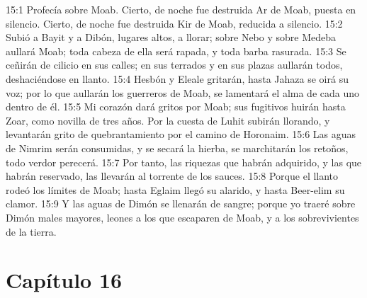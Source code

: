 15:1 Profecía sobre Moab. Cierto, de noche fue destruida Ar de Moab, puesta en silencio. Cierto, de noche fue destruida Kir de Moab, reducida a silencio. 
15:2 Subió a Bayit y a Dibón, lugares altos, a llorar; sobre Nebo y sobre Medeba aullará Moab; toda cabeza de ella será rapada, y toda barba rasurada. 
15:3 Se ceñirán de cilicio en sus calles; en sus terrados y en sus plazas aullarán todos, deshaciéndose en llanto. 
15:4 Hesbón y Eleale gritarán, hasta Jahaza se oirá su voz; por lo que aullarán los guerreros de Moab, se lamentará el alma de cada uno dentro de él. 
15:5 Mi corazón dará gritos por Moab; sus fugitivos huirán hasta Zoar, como novilla de tres años. Por la cuesta de Luhit subirán llorando, y levantarán grito de quebrantamiento por el camino de Horonaim. 
15:6 Las aguas de Nimrim serán consumidas, y se secará la hierba, se marchitarán los retoños, todo verdor perecerá. 
15:7 Por tanto, las riquezas que habrán adquirido, y las que habrán reservado, las llevarán al torrente de los sauces. 
15:8 Porque el llanto rodeó los límites de Moab; hasta Eglaim llegó su alarido, y hasta Beer-elim su clamor. 
15:9 Y las aguas de Dimón se llenarán de sangre; porque yo traeré sobre Dimón males mayores, leones a los que escaparen de Moab, y a los sobrevivientes de la tierra. 
\section*{Capítulo 16}
 
